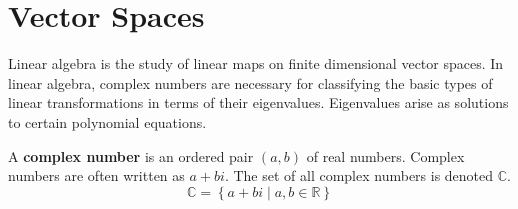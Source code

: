 \documentclass{article}
\newcommand{\real}{\mathbb{R}}
\newcommand{\complex}{\mathbb{C}}
\newcommand{\set}[2]{\left\{#1\;\vert\;#2\right\}}
\begin{document}
\section{Vector Spaces}
Linear algebra is the study of linear maps on finite dimensional vector spaces.
In linear algebra, complex numbers are necessary for classifying the basic types
of linear transformations in terms of their eigenvalues. Eigenvalues arise as
solutions to certain polynomial equations.

\begin{tcolorbox}[title=Complex Numbers]
    A \textbf{complex number} is an ordered pair $(a,b)$ of real numbers.
    Complex numbers are often written as $a+bi$. The set of all complex numbers
    is denoted $\complex$.
    \[
        \complex = \set{a+bi}{a,b\in\real}
    \]
\end{tcolorbox}
\end{document}
